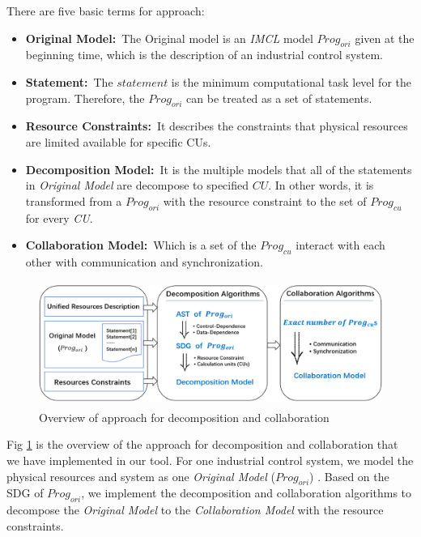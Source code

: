 


There are five basic terms for approach:
\begin{itemize}
  \item \textbf{Original Model:}\  The Original model is an \emph{IMCL} model $Prog_{ori}$ given at the beginning time, which is the description of an industrial control system.
  \item \textbf{Statement:}\ The $statement$ is the minimum computational task level for the program. Therefore, the $Prog_{ori}$ can be treated as a set of statements.
  \item \textbf{Resource Constraints:}\ It describes the constraints that physical resources are limited available for specific CUs.
  \item \textbf{Decomposition Model:}\  It is the multiple models that all of the statements in \emph{Original Model} are decompose to specified $CU$. In other words, it is transformed from a $Prog_{ori}$ with the resource constraint to the set of $Prog_{cu}$ for every \emph{CU}.
  \item \textbf{Collaboration Model:}\  Which is a set of the $Prog_{cu}$ interact with each other with communication and synchronization.
\end{itemize}

\begin{figure}[!ht]
    \centering
        \includegraphics[height=1.6in, width=4.5in]{fig_Approach}
    \caption{Overview of approach for decomposition and collaboration }\label{fig_approach}
\end{figure}

Fig \ref{fig_approach} is the overview of the approach for decomposition and collaboration that we have implemented in our tool. For one industrial control system, we model the physical resources and system as one \emph{Original Model} ($Prog_{ori}$) . Based on the SDG of $Prog_{ori}$, we implement the decomposition and collaboration algorithms to decompose the \emph{Original Model} to the \emph{Collaboration Model} with the resource constraints.

